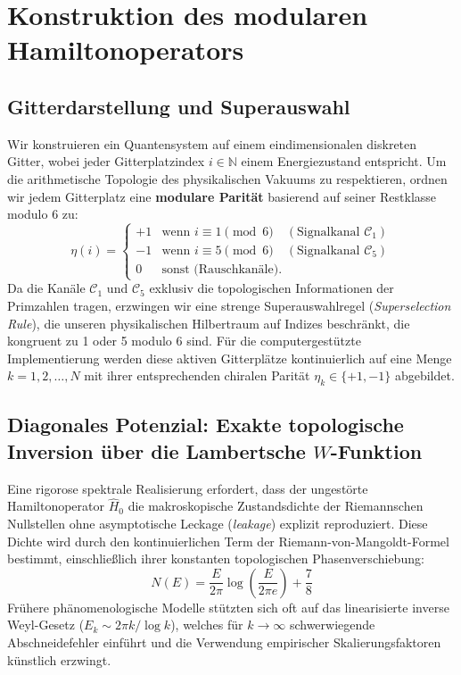 \documentclass[aps,prl,preprint,superscriptaddress,floatfix]{revtex4-2}
\begin{document}
\section{Konstruktion des modularen Hamiltonoperators}

\subsection{Gitterdarstellung und Superauswahl}

Wir konstruieren ein Quantensystem auf einem eindimensionalen diskreten Gitter, wobei jeder Gitterplatzindex $i \in \mathbb{N}$ einem Energiezustand entspricht. Um die arithmetische Topologie des physikalischen Vakuums zu respektieren, ordnen wir jedem Gitterplatz eine \textbf{modulare Parität} basierend auf seiner Restklasse modulo 6 zu:
\begin{equation}
\eta(i) = \begin{cases}
+1 & \text{wenn } i \equiv 1 \pmod 6 \quad (\text{Signalkanal } \mathcal{C}_1)\\
-1 & \text{wenn } i \equiv 5 \pmod 6 \quad (\text{Signalkanal } \mathcal{C}_5)\\
0 & \text{sonst (Rauschkanäle)}.
\end{cases}
\end{equation}
Da die Kanäle $\mathcal{C}_1$ und $\mathcal{C}_5$ exklusiv die topologischen Informationen der Primzahlen tragen, erzwingen wir eine strenge Superauswahlregel (\textit{Superselection Rule}), die unseren physikalischen Hilbertraum auf Indizes beschränkt, die kongruent zu 1 oder 5 modulo 6 sind. Für die computergestützte Implementierung werden diese aktiven Gitterplätze kontinuierlich auf eine Menge $k = 1,2,\dots,N$ mit ihrer entsprechenden chiralen Parität $\eta_k \in \{+1,-1\}$ abgebildet.

\subsection{Diagonales Potenzial: Exakte topologische Inversion über die Lambertsche \texorpdfstring{$W$}{W}-Funktion}

Eine rigorose spektrale Realisierung erfordert, dass der ungestörte Hamiltonoperator $\hat{H}_0$ die makroskopische Zustandsdichte der Riemannschen Nullstellen ohne asymptotische Leckage (\textit{leakage}) explizit reproduziert. Diese Dichte wird durch den kontinuierlichen Term der Riemann-von-Mangoldt-Formel bestimmt, einschließlich ihrer konstanten topologischen Phasenverschiebung:
\begin{equation}
N(E) = \frac{E}{2\pi} \log\left(\frac{E}{2\pi e}\right) + \frac{7}{8}
\end{equation}
Frühere phänomenologische Modelle stützten sich oft auf das linearisierte inverse Weyl-Gesetz ($E_k \sim 2\pi k / \log k$), welches für $k \to \infty$ schwerwiegende Abschneidefehler einführt und die Verwendung empirischer Skalierungsfaktoren künstlich erzwingt. 
\end{document}
